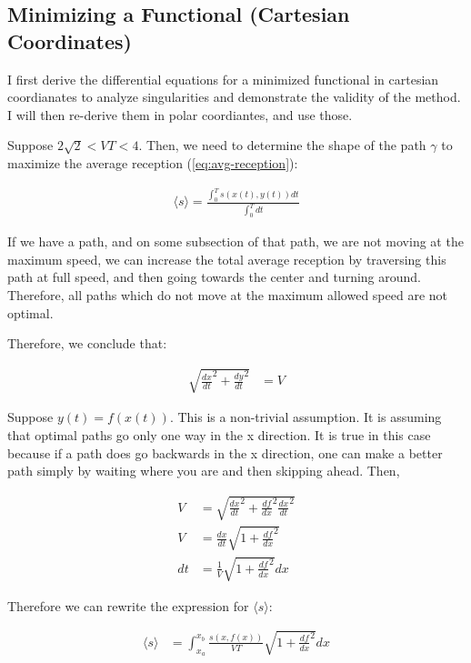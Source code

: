 \documentclass{article}
\begin{document}
\subsection{Minimizing a Functional (Cartesian Coordinates)} 

I first derive the differential equations for a minimized functional
	in cartesian coordianates to analyze singularities and demonstrate
	the validity of the method.
I will then re-derive them in polar coordiantes, and use those.

Suppose $2 \sqrt{2} < V T < 4  $.
Then, we need to determine the shape of the path $\gamma$ to maximize the
	average reception (\ref{eq:avg-reception}):

\begin{align}
\langle s \rangle = \frac{\int_0^T s(x(t),y(t)) dt}{\int_0^T dt} 
	\label{eq:avg-reception}
\end{align}

If we have a path, and on some subsection of that path, we are not moving at
	the maximum speed, we can increase the total average reception
	by traversing this path at full speed, and then going towards the center
	and turning around.
Therefore, all paths which do not move at the maximum allowed speed are not 
	optimal.

Therefore, we conclude that:

\begin{align}
\sqrt{\frac{dx}{dt}^2 + \frac{dy}{dt}^2} & = V
\end{align}

Suppose $y(t) = f(x(t))$.
This is a non-trivial assumption.
It is assuming that optimal paths go only one way in the x direction.
It is true in this case because if a path does go backwards in the
	x direction, one can make a better path simply by waiting where you 
	are and then skipping ahead.
Then,

\begin{align}
V & = \sqrt{\frac{dx}{dt}^2 + \frac{df}{dx}^2\frac{dx}{dt}^2}  \nonumber \\
V & = \frac{dx}{dt} \sqrt{ 1 + \frac{df}{dx}^2}  \nonumber \\
dt & = \frac{1}{V} \sqrt{1 + \frac{df}{dx}^2} dx \label{eq:dt-to-dx}
\end{align}

Therefore we can rewrite the expression for $\langle s \rangle$:

\begin{align}
\langle s \rangle & = \int_{x_a}^{x_b} 
	\frac{s(x,f(x))}{VT} \sqrt{1 + \frac{df}{dx}^2} dx \label{eq:path-integral}
\end{align}
\end{document}
